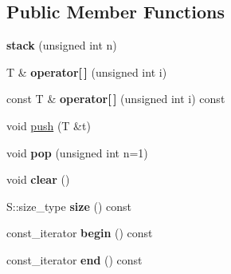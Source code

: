 \subsection*{Public Member Functions}
\begin{DoxyCompactItemize}
\item 
{\bfseries stack} (unsigned int n)\hypertarget{classEquationParser_1_1stack_a53002141fd9188b408a956c78b891a3e}{}\label{classEquationParser_1_1stack_a53002141fd9188b408a956c78b891a3e}

\item 
T \& {\bfseries operator\mbox{[}$\,$\mbox{]}} (unsigned int i)\hypertarget{classEquationParser_1_1stack_a1d68e52008e13d065377e9ff08f77ae9}{}\label{classEquationParser_1_1stack_a1d68e52008e13d065377e9ff08f77ae9}

\item 
const T \& {\bfseries operator\mbox{[}$\,$\mbox{]}} (unsigned int i) const \hypertarget{classEquationParser_1_1stack_a2f3e008e3b0e588b07de9e3e954930c2}{}\label{classEquationParser_1_1stack_a2f3e008e3b0e588b07de9e3e954930c2}

\item 
void \hyperlink{classEquationParser_1_1stack_afc5b5cd27279d5f799ee82c741466f96}{push} (T \&t)
\item 
void {\bfseries pop} (unsigned int n=1)\hypertarget{classEquationParser_1_1stack_a1af06a61b6153db22d1de607eaed4123}{}\label{classEquationParser_1_1stack_a1af06a61b6153db22d1de607eaed4123}

\item 
void {\bfseries clear} ()\hypertarget{classEquationParser_1_1stack_a0eccf84dc36173fcbda371eabfdcb460}{}\label{classEquationParser_1_1stack_a0eccf84dc36173fcbda371eabfdcb460}

\item 
S\+::size\+\_\+type {\bfseries size} () const \hypertarget{classEquationParser_1_1stack_a9097fcced4344a312463ba3c1f5ca9c8}{}\label{classEquationParser_1_1stack_a9097fcced4344a312463ba3c1f5ca9c8}

\item 
const\+\_\+iterator {\bfseries begin} () const \hypertarget{classEquationParser_1_1stack_a46ee174796ba7b658cd4a5ec5f387a0c}{}\label{classEquationParser_1_1stack_a46ee174796ba7b658cd4a5ec5f387a0c}

\item 
const\+\_\+iterator {\bfseries end} () const \hypertarget{classEquationParser_1_1stack_a1a74d0ecd28746f2fa6a7c8ed104e09b}{}\label{classEquationParser_1_1stack_a1a74d0ecd28746f2fa6a7c8ed104e09b}

\end{DoxyCompactItemize}


